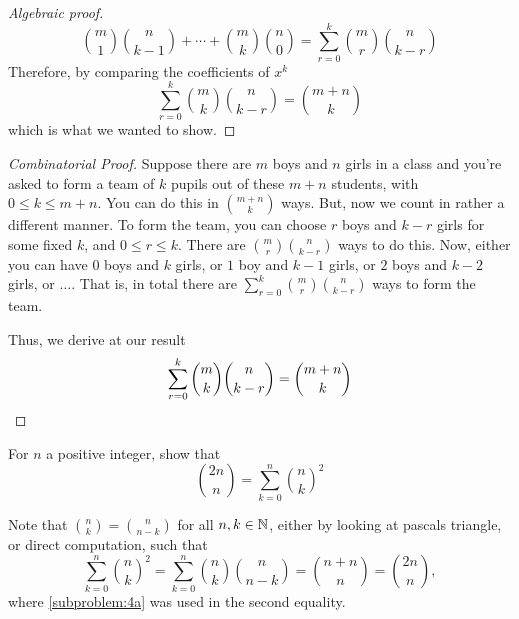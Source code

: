 \documentclass[a4paper, english, 12pt]{article} %
\begin{document}
\begin{answer}
\begin{proof}[Algebraic proof]
\begin{equation*}
      \binom{m}{1}\binom{n}{k-1} + \cdots +
      \binom{m}{k}\binom{n}{0}
      = \sum_{r = 0}^{k} \binom{m}{r} \binom{n}{k - r}
    \end{equation*}
    Therefore, by comparing the coefficients of $x^k$
    \begin{equation*}
      \sum_{r = 0}^k \binom{m}{k} \binom{n}{k - r} = \binom{m + n}{k}
    \end{equation*}
    which is what we wanted to show.
  \end{proof}
  \begin{proof}[Combinatorial Proof]
    Suppose there are $m$ boys and $n$ girls in a class and you're asked to form
    a team of $k$ pupils out of these $m+n$ students, with $0 \leq k \leq m +
    n$. You can do this in $\binom{m+n}{k}$ ways. But, now we count in rather a
    different manner. To form the team, you can choose $r$ boys and $k-r$ girls
    for some fixed $k$, and $0\leq r \leq k$. There are
    $\binom{m}{r}\binom{n}{k-r}$ ways to do this. Now, either you can have $0$
    boys and $k$ girls, or $1$ boy and $k-1$ girls, or $2$ boys and $k-2$ girls,
    or $\ldots$. That is, in total there are $\sum_{r=0}^k
    \binom{m}{r}\binom{n}{k-r}$ ways to form the team.

    Thus, we derive at our result
    \begin{equation*}
      \sum_{r = 0}^k \binom{m}{k} \binom{n}{k - r} = \binom{m + n}{k} \qedhere
    \end{equation*}
  \end{proof}
\end{answer}

\begin{subproblem}
  For $n$ a positive integer, show that
  \begin{equation*}
    \binom{2n}{n} = \sum_{k = 0}^{n} \binom{n}{k}^2
  \end{equation*}
\end{subproblem}

\begin{answer}
  Note that $\binom{n}{k}=\binom{n}{n-k}$ for all $n,k \in \mathbb{N}$, either by
  looking at pascals triangle, or direct computation, such that
  \begin{equation*}
    \sum_{k=0}^{n} \binom{n}{k}^2
    = \sum_{k=0}^{n} \binom{n}{k} \binom{n}{n-k}
    = \binom{n+n}{n} = \binom{2n}{n},
  \end{equation*}
  where \cref{subproblem:4a} was used in the second equality.
\end{answer}
\end{document}
